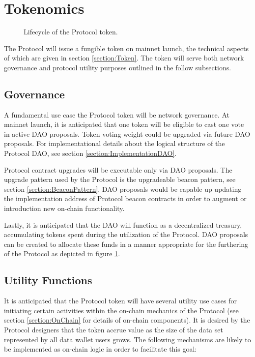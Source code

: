\section{Tokenomics}
\label{section:tokenomics}

\begin{figure}[!ht] 
    \centering
    \caption{Lifecycle of the Protocol token.}
    \label{fig:Tokenomics}
\end{figure}

The Protocol will issue a fungible token on mainnet launch, the technical aspects of which are given in section \ref{section:Token}. The token will serve both network governance and protocol utility purposes outlined in the follow subsections. 

\subsection{Governance}
\label{section:Governance}
A fundamental use case the Protocol token will be network governance. At mainnet launch, it is anticipated that one token will be eligible to cast one vote in active DAO proposals. Token voting weight could be upgraded via future DAO proposals. For implementational details about the logical structure of the Protocol DAO, see section \ref{section:ImplementationDAO}.

Protocol contract upgrades will be executable only via DAO proposals. The upgrade pattern used by the Protocol is the upgradeable beacon pattern, see section \ref{section:BeaconPattern}. DAO proposals would be capable up updating the implementation address of Protocol beacon contracts in order to augment or introduction new on-chain functionality.

Lastly, it is anticipated that the DAO will function as a decentralized treasury, accumulating tokens spent during the utilization of the Protocol. DAO proposals can be 
created to allocate these funds in a manner appropriate for the furthering of the Protocol as depicted in figure \ref{fig:Tokenomics}.

\subsection{Utility Functions}
\label{section:TokenUtility}

It is anticipated that the Protocol token will have several utility use cases for initiating certain activities within the on-chain mechanics of the Protocol (see section \ref{section:OnChain} for details of on-chain components). It is desired by the Protocol designers that the token accrue value as the size of the data set represented by all data wallet users grows. The following mechanisms are likely to be implemented as on-chain logic in order to facilitate this goal:

